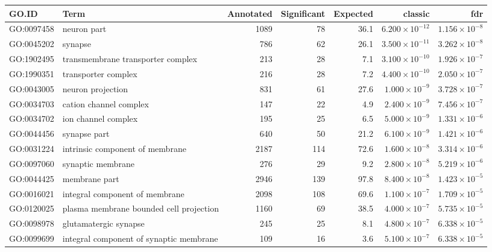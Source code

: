 \begin{table}[ht]
\centering
\begin{adjustbox}{max width=\textwidth}
\begin{tabular}{llrrrrr}
  \hline
GO.ID & Term & Annotated & Significant & Expected & classic & fdr \\ 
  \hline
GO:0097458 & neuron part & 1089 & 78 & 36.1 & $6.200 \times 10^{-12}$ & $1.156 \times 10^{-8}$ \\ 
  GO:0045202 & synapse & 786 & 62 & 26.1 & $3.500 \times 10^{-11}$ & $3.262 \times 10^{-8}$ \\ 
  GO:1902495 & transmembrane transporter complex & 213 & 28 & 7.1 & $3.100 \times 10^{-10}$ & $1.926 \times 10^{-7}$ \\ 
  GO:1990351 & transporter complex & 216 & 28 & 7.2 & $4.400 \times 10^{-10}$ & $2.050 \times 10^{-7}$ \\ 
  GO:0043005 & neuron projection & 831 & 61 & 27.6 & $1.000 \times 10^{-9}$ & $3.728 \times 10^{-7}$ \\ 
  GO:0034703 & cation channel complex & 147 & 22 & 4.9 & $2.400 \times 10^{-9}$ & $7.456 \times 10^{-7}$ \\ 
  GO:0034702 & ion channel complex & 195 & 25 & 6.5 & $5.000 \times 10^{-9}$ & $1.331 \times 10^{-6}$ \\ 
  GO:0044456 & synapse part & 640 & 50 & 21.2 & $6.100 \times 10^{-9}$ & $1.421 \times 10^{-6}$ \\ 
  GO:0031224 & intrinsic component of membrane & 2187 & 114 & 72.6 & $1.600 \times 10^{-8}$ & $3.314 \times 10^{-6}$ \\ 
  GO:0097060 & synaptic membrane & 276 & 29 & 9.2 & $2.800 \times 10^{-8}$ & $5.219 \times 10^{-6}$ \\ 
  GO:0044425 & membrane part & 2946 & 139 & 97.8 & $8.400 \times 10^{-8}$ & $1.423 \times 10^{-5}$ \\ 
  GO:0016021 & integral component of membrane & 2098 & 108 & 69.6 & $1.100 \times 10^{-7}$ & $1.709 \times 10^{-5}$ \\ 
  GO:0120025 & plasma membrane bounded cell projection & 1160 & 69 & 38.5 & $4.000 \times 10^{-7}$ & $5.735 \times 10^{-5}$ \\ 
  GO:0098978 & glutamatergic synapse & 245 & 25 & 8.1 & $4.800 \times 10^{-7}$ & $6.338 \times 10^{-5}$ \\ 
  GO:0099699 & integral component of synaptic membrane & 109 & 16 & 3.6 & $5.100 \times 10^{-7}$ & $6.338 \times 10^{-5}$ \\ 

\end{tabular}
\end{adjustbox}
\end{table}
